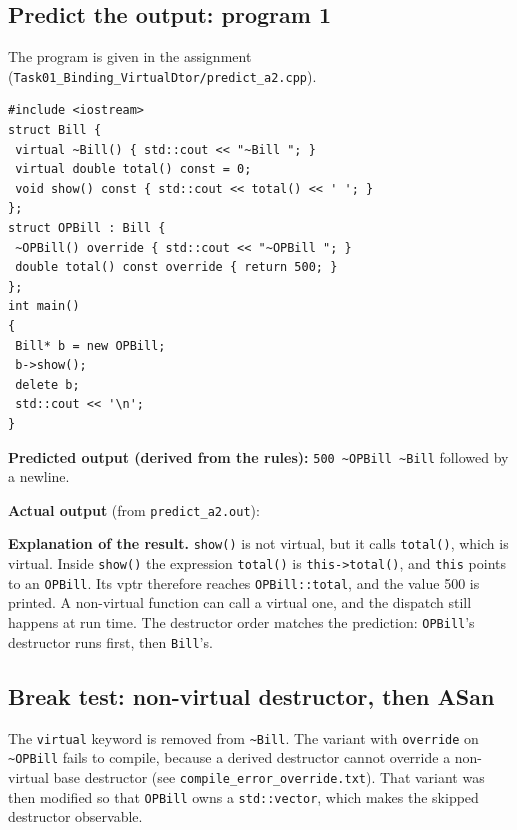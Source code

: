 \documentclass[11pt,a4paper]{article}
\newcommand{\lstout}[2]{}
\begin{document}
\subsection*{Predict the output: program 1}
The program is given in the assignment (\texttt{Task01\_Binding\_VirtualDtor/predict\_a2.cpp}).

\begin{lstlisting}[caption={predict\_a2.cpp (as given)}]
#include <iostream>
struct Bill {
 virtual ~Bill() { std::cout << "~Bill "; }
 virtual double total() const = 0;
 void show() const { std::cout << total() << ' '; }
};
struct OPBill : Bill {
 ~OPBill() override { std::cout << "~OPBill "; }
 double total() const override { return 500; }
};
int main()
{
 Bill* b = new OPBill;
 b->show();
 delete b;
 std::cout << '\n';
}
\end{lstlisting}

\textbf{Predicted output (derived from the rules):} \texttt{500 \~{}OPBill \~{}Bill} followed by a newline.

\textbf{Actual output} (from \texttt{predict\_a2.out}):
\lstout{../Task01_Binding_VirtualDtor/predict_a2.out}{Actual output of predict\_a2}

\textbf{Explanation of the result.} \texttt{show()} is not virtual, but it calls \texttt{total()}, which is virtual. Inside \texttt{show()} the expression \texttt{total()} is \texttt{this->total()}, and \texttt{this} points to an \texttt{OPBill}. Its vptr therefore reaches \texttt{OPBill::total}, and the value 500 is printed. A non-virtual function can call a virtual one, and the dispatch still happens at run time. The destructor order matches the prediction: \texttt{OPBill}'s destructor runs first, then \texttt{Bill}'s.

\subsection*{Break test: non-virtual destructor, then ASan}
The \texttt{virtual} keyword is removed from \texttt{\~{}Bill}. The variant with \texttt{override} on \texttt{\~{}OPBill} fails to compile, because a derived destructor cannot override a non-virtual base destructor (see \texttt{compile\_error\_override.txt}). That variant was then modified so that \texttt{OPBill} owns a \texttt{std::vector}, which makes the skipped destructor observable.

\lstout{../Task01_Binding_VirtualDtor/nonvirtual_dtor.cpp}{Non-virtual destructor version (listing)}
\lstout{../Task01_Binding_VirtualDtor/nonvirtual_dtor.out}{Output of the non-virtual destructor version}
\end{document}
